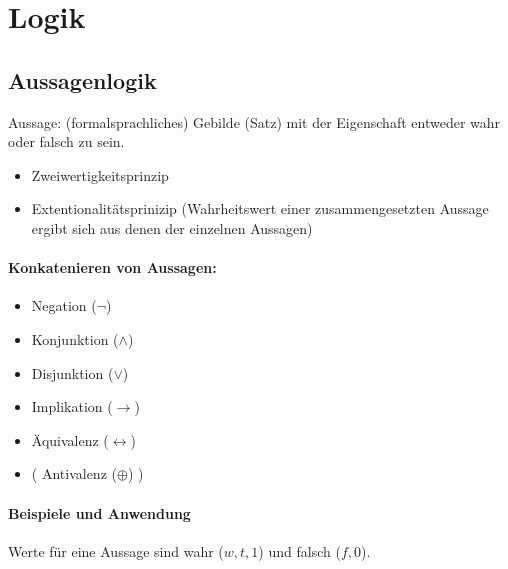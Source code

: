 %
\section{Logik}
\subsection{Aussagenlogik}
Aussage: (formalsprachliches) Gebilde (Satz) mit der Eigenschaft entweder wahr oder falsch zu sein.
%
\begin{itemize}
\item Zweiwertigkeitsprinzip
\item Extentionalitätsprinizip (Wahrheitswert einer zusammengesetzten Aussage ergibt sich aus denen der einzelnen Aussagen)
\end{itemize}
%
\paragraph{Konkatenieren von Aussagen:}
\begin{itemize}
\item Negation (\( \neg \)) 
\item Konjunktion (\( \land \)) 
\item Disjunktion (\( \lor \)) 
\item Implikation (\( \rightarrow \)) 
\item Äquivalenz (\( \leftrightarrow \)) 
\item ( Antivalenz (\( \oplus \)) ) 
\end{itemize}
%
\paragraph{Beispiele und Anwendung}
%
Werte für eine Aussage sind wahr (\( w,t,1 \)) und falsch (\( f,0 \)).
%
